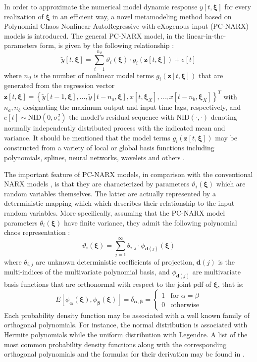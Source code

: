 \documentclass[preprint,3p,review,times,11pt]{elsarticle}
\newcommand{\beq}{\begin{equation}}
\newcommand{\eeq}{\end{equation}}
\newcommand{\bld}[1]{\boldsymbol{#1}}
\newcommand{\bxi}{\bld{\xi}}
\begin{document}
In order to approximate the numerical model dynamic response $y[t,\bxi]$ for every realization of $\bxi$ in an efficient way, a novel metamodeling method based on Polynomial Chaos Nonlinear AutoRegressive with eXogenous input (PC-NARX) models is introduced. The general PC-NARX model, in the linear-in-the-parameters form, is given by the following relationship \cite{Chen-Billings1989}:
\beq \tilde{y}[t,\bxi] =  \sum_{i=1}^{n_\vartheta} \vartheta_i(\bxi) \cdot g_i({\bld z}[t,\bxi]) + e[t] \label{eq:PCNARX}\eeq
where $n_\vartheta$ is the number of nonlinear model terms $g_i({\bld z}[t,\bxi])$ that are generated from the regression vector ${\bld z}[t,\bxi] = \left\{ \tilde{y}[t-1,\bxi], \ldots, \tilde{y}[t-n_a,\bxi],  x[t,\bxi_X],\ldots ,x[t-n_b,\bxi_X] \right\}^T$ with $n_a, n_b$ designating the maximum output and input time lags, respectively, and $e[t]\! \sim\! \text{NID} (0,\sigma^2_e)$ the model's residual sequence with NID$(\cdot,\cdot)$ denoting normally independently distributed process with the indicated mean and variance. It should be mentioned that the model terms $g_i({\bld z}[t,\bxi])$ may be constructed from a variety of local or global basis functions including polynomials, splines, neural networks, wavelets and others \cite{Wei-Billings2009}.

The important feature of PC-NARX models, in comparison with the conventional NARX models \cite{Chen-Billings1989}, is that they are characterized by parameters $\vartheta_i(\bxi)$ which are random variables themselves. The latter are actually represented by a deterministic mapping which which describes their relationship to the input random variables. More specifically, assuming that the PC-NARX model parameters $\theta_i(\bxi)$ have finite variance, they admit the following polynomial chaos representation \cite{Soize-Ghanem2004}:
\beq 
\vartheta_i (\bxi) = \sum_{j=1}^{\infty } \theta_{i,j}\cdot \phi_{\bld{d}(j)}(\bxi) \label{eq:PCE}
\eeq
where $\theta_{i,j}$ are unknown deterministic coefficients of projection, ${\bld d}{(j)}$ is the multi-indices of the multivariate polynomial basis, and $\phi_{{\bld d}(j)}$ are multivariate basis functions that are orthonormal with respect to the joint pdf of $\bxi$, that is:
\beq
E[ \phi_{\bld \alpha} (\bxi), \phi_{\bld \beta} (\bxi) ] = \delta_{{\bld \alpha},{\bld \beta}} =\begin{cases} 1 & \mbox{for } \alpha = \beta \\ 0 & \mbox{otherwise} \end{cases}
\eeq
Each probability density function may be associated with a well known family of orthogonal polynomials. For instance, the normal distribution is associated with Hermite polynomials while the uniform distribution with Legendre. A list of the most common probability density functions along with the corresponding orthogonal polynomials and the formulas for their derivation may be found in \cite{Soize-Ghanem2004}.
\end{document}
